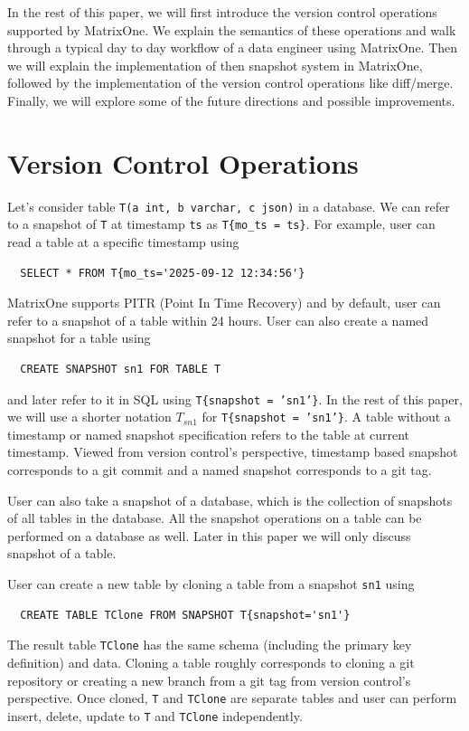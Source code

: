 \documentclass[sigconf,nonacm]{acmart} %
\begin{document}
In the rest of this paper, we will first introduce the version control operations
supported by MatrixOne.  We explain the semantics of these operations and 
walk through a typical day to day workflow of a data engineer using MatrixOne.
Then we will explain the implementation of then snapshot system in 
MatrixOne, followed by the implementation of the version control 
operations like diff/merge.  Finally, we will explore some of the 
future directions and possible improvements.

\section{Version Control Operations}\label{sec:vcop}
Let's consider table \texttt{T(a int, b varchar, c json)} in a database.  
We can refer to a snapshot of \texttt{T} at timestamp
\texttt{ts} as \texttt{T\{mo\_ts = ts\}}.  For example, user can read a table 
at a specific timestamp using 
\begin{verbatim}
  SELECT * FROM T{mo_ts='2025-09-12 12:34:56'}
\end{verbatim}
MatrixOne supports PITR (Point In Time Recovery) and by default, user can refer
to a snapshot of a table within 24 hours.  User can also create a named snapshot
for a table using 
\begin{verbatim}
  CREATE SNAPSHOT sn1 FOR TABLE T
\end{verbatim}  
and later refer to it in SQL using \texttt{T\{snapshot = 'sn1'\}}.  
In the rest of this paper, we will use a shorter notation 
$T_{sn1}$ for  \texttt{T\{snapshot = 'sn1'\}}. 
A table without a timestamp or named snapshot specification refers to the table
at current timestamp. Viewed from version control's perspective, timestamp based snapshot
corresponds to a git commit and a named snapshot corresponds to a git tag.

User can also take a snapshot of a database, which is the collection of snapshots 
of all tables in the database.  All the snapshot operations on a table can be performed
on a database as well.  Later in this paper we will only discuss 
snapshot of a table.

User can create a new table by cloning a table from a snapshot \texttt{sn1} using 
\begin{verbatim}
  CREATE TABLE TClone FROM SNAPSHOT T{snapshot='sn1'}
\end{verbatim}
The result table \texttt{TClone} has the same schema (including 
the primary key definition) and data.  Cloning a table roughly 
corresponds to cloning a git repository or creating a new branch 
from a git tag from version control's perspective.  
Once cloned, \texttt{T} and \texttt{TClone} are 
separate tables and user can perform insert, delete, update 
to \texttt{T} and \texttt{TClone} 
independently.  
\end{document}
